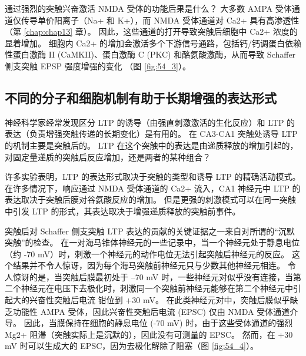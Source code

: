 通过强烈的突触兴奋激活 NMDA 受体的功能后果是什么？
大多数 AMPA 受体通道仅传导单价阳离子（Na+ 和 K+），而 NMDA 受体通道对 Ca2+ 具有高渗透性（第 \ref{chap:chap13} 章）。
因此，这些通道的打开导致突触后细胞中 Ca2+ 浓度的显着增加。
细胞内 Ca2+ 的增加会激活多个下游信号通路，包括钙/钙调蛋白依赖性蛋白激酶 II (CaMKII)、蛋白激酶 C (PKC) 和酪氨酸激酶，从而导致 Schaffer 侧支突触 EPSP 强度增强的变化 （图 \ref{fig:54_3}）。



\subsection{不同的分子和细胞机制有助于长期增强的表达形式}

神经科学家经常发现区分 LTP 的诱导（由强直刺激激活的生化反应）和 LTP 的表达（负责增强突触传递的长期变化）是有用的。
在 CA3-CA1 突触处诱导 LTP 的机制主要是突触后的。
LTP 在这个突触中的表达是由递质释放的增加引起的，对固定量递质的突触后反应增加，还是两者的某种组合？


许多实验表明，LTP 的表达形式取决于突触的类型和诱导 LTP 的精确活动模式。
在许多情况下，响应通过 NMDA 受体通道的 Ca2+ 流入，CA1 神经元中 LTP 的表达取决于突触后膜对谷氨酸反应的增加。
但是更强的刺激模式可以在同一突触中引发 LTP 的形式，其表达取决于增强递质释放的突触前事件。


突触后对 Schaffer 侧支突触 LTP 表达的贡献的关键证据之一来自对所谓的“沉默突触”的检查。
在一对海马锥体神经元的一些记录中，当一个神经元处于静息电位（约 -70 mV）时，刺激一个神经元的动作电位无法引起突触后神经元的反应。
这个结果并不令人惊讶，因为每个海马突触前神经元只与少数其他神经元相连。
令人惊讶的是，当突触后膜最初处于 –70 mV 时，一些神经元对似乎没有连接，当第二个神经元在电压下去极化时，刺激同一个突触前神经元能够在第二个神经元中引起大的兴奋性突触后电流 钳位到 +30 mV。
在此类神经元对中，突触后膜似乎缺乏功能性 AMPA 受体，因此兴奋性突触后电流 (EPSC) 仅由 NMDA 受体通道介导。
因此，当膜保持在细胞的静息电位 (-70 mV) 时，由于这些受体通道的强烈 Mg2+ 阻滞（突触实际上是沉默的），因此没有可测量的 EPSC。
然而，在 +30 mV 时可以生成大的 EPSC，因为去极化解除了阻塞（图 \ref{fig:54_4}）。


